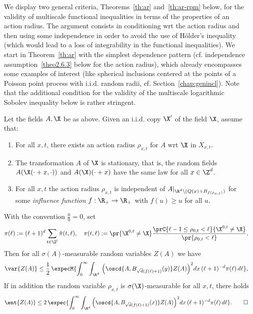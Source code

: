 We display two general criteria, Theorems~\ref{th:ar} and~\ref{th:ar-rpm} below, for the validity of multiscale functional inequalities in terms of the properties of an action radius. The argument consists in conditioning wrt the action radius and then using some independence in order to avoid the use of H\"older's inequality (which would lead to a loss of integrability in the functional inequalities). We start in Theorem~\ref{th:ar} with the simplest dependence pattern (cf. independence assumption~\eqref{theo2.6.3} below for the action radius), which already encompasses some examples of interest (like spherical inclusions centered at the points of a Poisson point process with i.i.d. random radii, cf. Section~\ref{chap:genincl}). Note that the additional condition for the validity of the multiscale logarithmic Sobolev inequality below is rather stringent.
\begin{theo}\label{th:ar}
Let the fields $A,\X$ be as above. Given an i.i.d. copy $\X'$ of the field $\X$, assume that:
\begin{enumerate} \alphenumi 
\item \label{theo2.6.1}For all $x,t$, there exists an action radius $\rho_{x,t}$ for $A$ wrt $\X$ in $X_{x,t}$.
\item \label{theo2.6.2}The transformation $A$ of $\X$ is stationary, that is, the random fields\linebreak $A(\X(\cdot+x,\cdot))$ and $A(\X)(\cdot+x)$ have the same law for all $x\in\Z^d$.
\item \label{theo2.6.3}For all $x,t$ the action radius $\rho_{x,t}$ is independent of $A|_{\R^d\setminus (Q(x)+B_{f(\rho_{x,t})})}$ for some \emph{influence function} $f:\R_+\to\R_+$ with $f(u)\ge u$ for all $u$.
\end{enumerate}
With the convention $\frac00=0$, set
\[
\pi(\ell):=(\ell+1)^{d}\sum_{t\in\Z^l}\tilde\pi(t,\ell),\quad
\pi(t,\ell):=\pr{\X^{0,t}\ne \X}\frac{\prC{\ell-1\le\rho_{0,t}<\ell}{\X^{0,t}\ne \X}}{\pr{\rho_{0,t}<\ell}}.
\]
Then for all $\sigma(A)$-measurable random variables $Z(A)$ we have
\begin{equation}\label{eq:arwsg2}
\var{Z(A)}\le\frac12\,\expecM{\int_0^\infty\int_{\R^d}\,\Big(\oscd{A,B_{\sqrt d(f(\ell)+1)}(y)}Z(A)\Big)^2dx\,(\ell+1)^{-d} \pi(\ell)\,d\ell},
\end{equation}
If in addition the random variable $\rho_{x,t}$ is $\sigma(\X)$-measurable for all $x,t$, there holds
\begin{equation}
\ent{Z(A)}\le2\,\expec{ \int_{0}^\infty \int_{\R^d}\Big(\oscd{A,B_{\sqrt{d}(f(\ell)+1)}(x)}Z(A)\Big)^2dx\,(\ell+1)^{-d}\pi(\ell)\,d\ell}.\label{eq:arlsi2}
\qedhere
\end{equation}

\end{theo}

